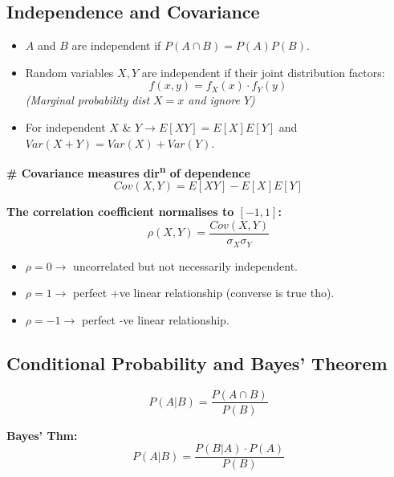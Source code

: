 \subsection{Independence and Covariance}
\begin{itemize}
    \item $A$ and $B$ are independent if $P(A \cap B) = P(A)P(B)$.
    \item Random variables $X, Y$ are independent if their joint distribution factors: 
    \[ f(x,y) = f_X(x) \cdot f_Y(y) \]
    \textit{(Marginal probability dist $X=x$ and ignore $Y$)}
    \item For independent $X$ \& $Y \rightarrow E[XY] = E[X]E[Y]$ and $Var(X+Y) = Var(X) + Var(Y)$.
\end{itemize}

\textbf{\# Covariance measures dir\textsuperscript{n} of dependence}
\[ Cov(X,Y) = E[XY] - E[X]E[Y] \]

\textbf{The correlation coefficient normalises to $[-1, 1]$:}
\[ \rho(X,Y) = \frac{Cov(X,Y)}{\sigma_X \sigma_Y} \]
\begin{itemize}
    \item $\rho = 0 \rightarrow$ uncorrelated but not necessarily independent.
    \item $\rho = 1 \rightarrow$ perfect +ve linear relationship (converse is true tho).
    \item $\rho = -1 \rightarrow$ perfect -ve linear relationship.
\end{itemize}

\subsection{Conditional Probability and Bayes' Theorem}
\[ P(A|B) = \frac{P(A \cap B)}{P(B)} \]

\textbf{Bayes' Thm:}
\[ P(A|B) = \frac{P(B|A) \cdot P(A)}{P(B)} \]